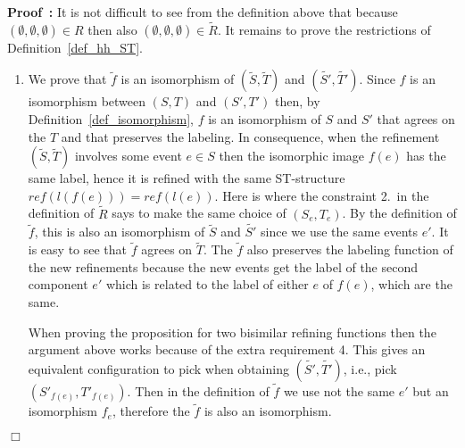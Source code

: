 \documentclass[submission,copyright,creativecommons]{eptcs}
\newenvironment{proof}[1][\!\!\,]{\vspace{1ex}\noindent\textbf{Proof #1: }}{\hfill$\Box$\vspace{2ex}}
\newcommand\reffun{\ensuremath{\mathit{ref}}}
\newcommand\refinement[1]{\ensuremath{\widetilde{#1}}}
\begin{document}
\begin{proof}
It is not difficult to see from the definition above that because $(\emptyset,\emptyset,\emptyset)\in R$ then also  $(\emptyset,\emptyset,\emptyset)\in \refinement{R}$.
It remains to prove the restrictions of Definition~\ref{def_hh_ST}.

\begin{enumerate} 
\item We prove that $\refinement{f}$ is an isomorphism of $(\refinement{S},\refinement{T})$ and $(\refinement{S'},\refinement{T'})$. Since $f$ is an isomorphism between $(S,T)$ and $(S',T')$ then, by Definition~\ref{def_isomorphism}, $f$ is an isomorphism of $S$ and $S'$ that agrees on the $T$ and that preserves the labeling. In consequence, when the refinement $(\refinement{S},\refinement{T})$ involves some event $e\in S$ then the isomorphic image $f(e)$ has the same label, hence it is refined with the same ST-structure $\reffun(l(f(e)))=\reffun(l(e))$. Here is where the constraint 2.\ in the definition of $\refinement{R}$ says to make the same choice of $(S_{e},T_{e})$.
By the definition of $\refinement{f}$, this is also an isomorphism of $\refinement{S}$ and $\refinement{S'}$ since we use the same events $e'$. It is easy to see that $\refinement{f}$ agrees on $\refinement{T}$. The $\refinement{f}$ also preserves the labeling function of the new refinements because the new events get the label of the second component $e'$ which is related to the label of either $e$ of $f(e)$, which are the same.

When proving the proposition for two bisimilar refining functions then the argument above works because of the extra requirement 4. This gives an equivalent configuration to pick when obtaining $(\refinement{S'},\refinement{T'})$, i.e., pick $(S'_{f(e)},T'_{f(e)})$. Then in the definition of $\refinement{f}$ we use not the same $e'$ but an isomorphism $f_{e}$, therefore the $\refinement{f}$ is also an isomorphism.


\end{enumerate}
\end{proof}
\end{document}
